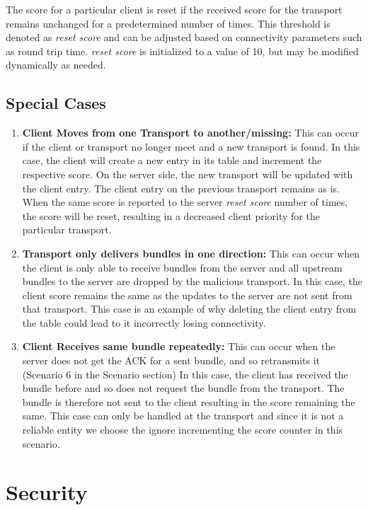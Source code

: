The score for a particular client is reset if the received score for the transport remains unchanged for a predetermined number of times. This threshold is denoted as  \textit{reset score} and can be adjusted based on connectivity parameters such as round trip time. \textit{reset score} is initialized to a value of 10, but may be modified dynamically as needed.

\subsection{Special Cases}

\begin{enumerate}
    \item \textbf{Client Moves from one Transport to another/missing:} This can occur if the client or transport no longer meet and a new transport is found.
        \subitem In this case, the client will create a new entry in its table and increment the respective score. On the server side, the new transport will be updated with the client entry. The client entry on the previous transport remains as is. When the same score is reported to the server \textit{reset score} number of times, the score will be reset, resulting in a decreased client priority for the particular transport.
    \item \textbf{Transport only delivers bundles in one direction:} This can occur when the client is only able to receive bundles from the server and all upstream bundles to the server are dropped by the malicious transport.
        \subitem In this case, the client score remains the same as the updates to the server are not sent from that transport. This case is an example of why deleting the client entry from the table could lead to it incorrectly losing connectivity.
    \item \textbf{Client Receives same bundle repeatedly:} This can occur when the server does not get the ACK for a sent bundle, and so retransmits it (Scenario 6 in the Scenario section)
        \subitem In this case, the client has received the bundle before and so does not request the bundle from the transport. The bundle is therefore not sent to the client resulting in the score remaining the same. This case can only be handled at the transport and since it is not a reliable entity we choose the ignore incrementing the score counter in this scenario.
\end{enumerate}


\section{Security}

